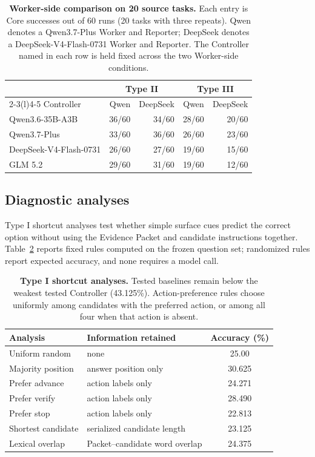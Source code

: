 \begin{table}[H]
\caption{\textbf{Worker-side comparison on 20 source tasks.} Each entry is
Core successes out of 60 runs (20 tasks with three repeats). Qwen denotes a
Qwen3.7-Plus Worker and Reporter; DeepSeek denotes a
DeepSeek-V4-Flash-0731 Worker and Reporter. The Controller named in each row
is held fixed across the two Worker-side conditions.}
\label{tab:worker-side-comparison}
\centering
\small
\setlength{\tabcolsep}{5pt}
\begin{tabular}{@{}lrrrr@{}}
\toprule
& \multicolumn{2}{c}{Type II} & \multicolumn{2}{c}{Type III} \\
\cmidrule(lr){2-3}\cmidrule(l){4-5}
Controller & Qwen & DeepSeek & Qwen & DeepSeek \\
\midrule
Qwen3.6-35B-A3B & 36/60 & 34/60 & 28/60 & 20/60 \\
Qwen3.7-Plus & 33/60 & 36/60 & 26/60 & 23/60 \\
DeepSeek-V4-Flash-0731 & 26/60 & 27/60 & 19/60 & 15/60 \\
GLM 5.2 & 29/60 & 31/60 & 19/60 & 12/60 \\
\bottomrule
\end{tabular}
\end{table}

\subsection{Diagnostic analyses}

Type I shortcut analyses test whether simple surface cues predict the correct option without using the Evidence Packet and candidate instructions together. Table~\ref{tab:type-i-shortcuts} reports fixed rules computed on the frozen question set; randomized rules report expected accuracy, and none requires a model call.

\begin{table}[H]
\caption{\textbf{Type I shortcut analyses.} Tested baselines remain below the weakest tested Controller (43.125\%). Action-preference rules choose uniformly among candidates with the preferred action, or among all four when that action is absent.}
\label{tab:type-i-shortcuts}
\centering
\small
\begin{tabularx}{\linewidth}{@{}>{\raggedright\arraybackslash}X>{\raggedright\arraybackslash}Xc@{}}
\toprule
Analysis & Information retained & Accuracy (\%) \\
\midrule
Uniform random & none & 25.00 \\
Majority position & answer position only & 30.625 \\
Prefer advance & action labels only & 24.271 \\
Prefer verify & action labels only & 28.490 \\
Prefer stop & action labels only & 22.813 \\
Shortest candidate & serialized candidate length & 23.125 \\
Lexical overlap & Packet--candidate word overlap & 24.375 \\
\bottomrule
\end{tabularx}
\end{table}

